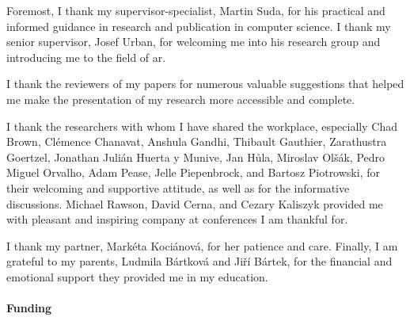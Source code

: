 \begin{thanks}
Foremost, I thank my supervisor-specialist, Martin Suda, for his practical and informed guidance in research and publication in computer science.
I thank my senior supervisor, Josef Urban, for welcoming me into his research group and introducing me to the field of \gls{ar}.

I thank the reviewers of my papers for numerous valuable suggestions that helped me make the presentation of my research more accessible and complete.

I thank the researchers with whom I have shared the workplace, especially
Chad Brown,
Clémence Chanavat,
Anshula Gandhi,
Thibault Gauthier,
Zarathustra Goertzel,
Jonathan Julián Huerta y Munive,
Jan Hůla,
Miroslav Olšák,
Pedro Miguel Orvalho,
Adam Pease,
Jelle Piepenbrock, and
Bartosz Piotrowski,
for their welcoming and supportive attitude, as well as for the informative discussions.
Michael Rawson, David Cerna, and Cezary Kaliszyk provided me with pleasant and inspiring company at conferences I am thankful for.

I thank my partner, Markéta Kociánová, for her patience and care.
Finally, I am grateful to my parents, Ludmila Bártková and Jiří Bártek, for the financial and emotional support they provided me in my education.

\paragraph{Funding}




\end{thanks}
